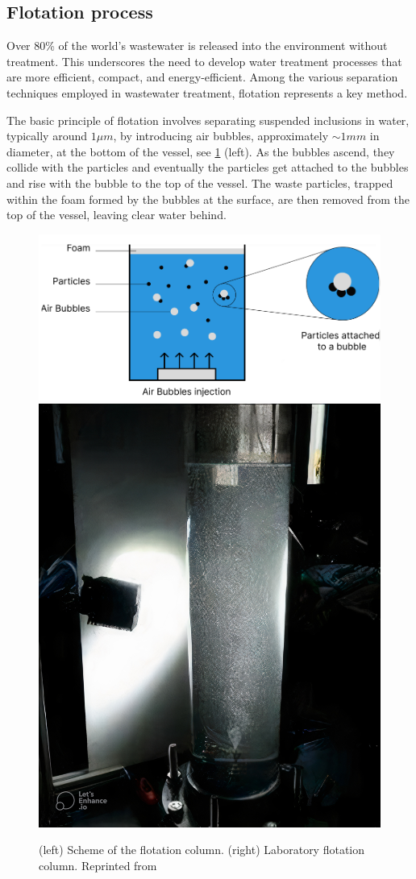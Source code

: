 \subsection{Flotation process}

Over 80\% of the world’s wastewater is released into the environment without treatment. 
This underscores the need to develop water treatment processes that are more efficient, compact, and energy-efficient. 
Among the various separation techniques employed in wastewater treatment, flotation represents a key method. 

The basic principle of flotation involves separating suspended inclusions in water, typically around $1\mu m$, by introducing air bubbles, approximately $\sim 1 mm$ in diameter, at the bottom of the vessel, see \ref{fig:flo} (left).   
As the bubbles ascend, they collide with the particles and eventually the particles get attached to the bubbles and rise with the bubble to the top of the vessel.
The waste particles, trapped within the foam formed by the bubbles at the surface, are then removed from the top of the vessel, leaving clear water behind.  
\begin{figure}[h!]
    \centering
    \includegraphics[height=0.3\textwidth]{image/flo_scheme.png}
    \includegraphics[height=0.3\textwidth]{image/flo_LE_auto_x4.jpg}
    \caption{
        (left) Scheme of the flotation column. 
        (right) Laboratory flotation column. 
        Reprinted from \citet{landal2025}
        }
        \label{fig:flo}
\end{figure}

